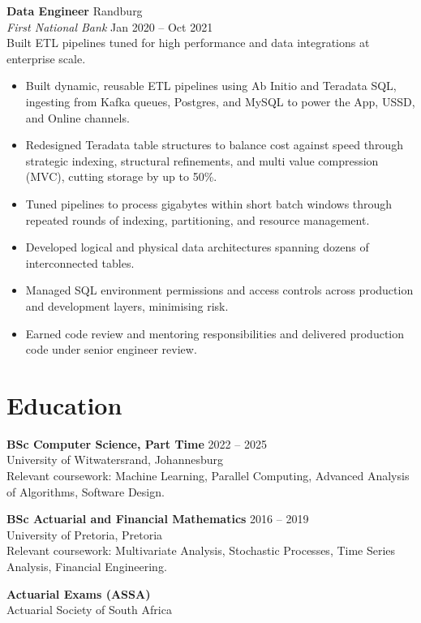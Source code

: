\documentclass[10pt,a4paper]{article}
\newcommand{\role}[4]{%
  \noindent\textbf{#1} \hfill \textcolor{muted}{#3}\\
  \textit{#2} \hfill \textcolor{muted}{#4}\\[2pt]
}
\begin{document}
\newpage
\role{Data Engineer}{First National Bank}{Randburg}{Jan 2020 -- Oct 2021}
Built ETL pipelines tuned for high performance and data integrations at enterprise scale.
\begin{itemize}
  \item Built dynamic, reusable ETL pipelines using Ab Initio and Teradata SQL, ingesting from Kafka queues,
    Postgres, and MySQL to power the App, USSD, and Online channels.
  \item Redesigned Teradata table structures to balance cost against speed through strategic indexing,
    structural refinements, and multi value compression (MVC), cutting storage by up to 50\%.
  \item Tuned pipelines to process gigabytes within short batch windows through repeated rounds of indexing,
    partitioning, and resource management.
  \item Developed logical and physical data architectures spanning dozens of interconnected tables.
  \item Managed SQL environment permissions and access controls across production and development layers,
    minimising risk.
  \item Earned code review and mentoring responsibilities and delivered production code under senior
    engineer review.
\end{itemize}

\section*{Education}
\textbf{BSc Computer Science, Part Time} \hfill \textcolor{muted}{2022 -- 2025}\\
University of Witwatersrand, Johannesburg\\
\textcolor{muted}{Relevant coursework: Machine Learning, Parallel Computing, Advanced Analysis of
Algorithms, Software Design.}

\vspace{4pt}
\textbf{BSc Actuarial and Financial Mathematics} \hfill \textcolor{muted}{2016 -- 2019}\\
University of Pretoria, Pretoria\\
\textcolor{muted}{Relevant coursework: Multivariate Analysis, Stochastic Processes, Time Series Analysis,
Financial Engineering.}

\vspace{4pt}
\textbf{Actuarial Exams (ASSA)} \hfill \textcolor{muted}{}\\
Actuarial Society of South Africa
\end{document}
